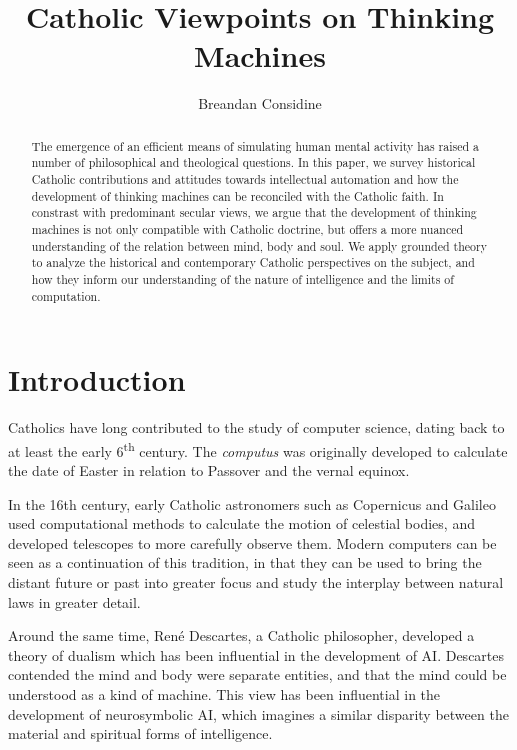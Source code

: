 \documentclass[sigplan,nonacm]{acmart}\settopmatter{printfolios=false,printccs=false,printacmref=false}
\begin{document}
  \title{Catholic Viewpoints on Thinking Machines}
  \begin{abstract}
    The emergence of an efficient means of simulating human mental activity has raised a number of philosophical and theological questions. In this paper, we survey historical Catholic contributions and attitudes towards intellectual automation and how the development of thinking machines can be reconciled with the Catholic faith. In constrast with predominant secular views, we argue that the development of thinking machines is not only compatible with Catholic doctrine, but offers a more nuanced understanding of the relation between mind, body and soul. We apply grounded theory to analyze the historical and contemporary Catholic perspectives on the subject, and how they inform our understanding of the nature of intelligence and the limits of computation.
  \end{abstract}

  \author{Breandan Considine}

  \maketitle

  \section{Introduction}

  Catholics have long contributed to the study of computer science, dating back to at least the early 6\textsuperscript{th} century. The \textit{computus} was originally developed to calculate the date of Easter in relation to Passover and the vernal equinox.

  In the 16th century, early Catholic astronomers such as Copernicus and Galileo used computational methods to calculate the motion of celestial bodies, and developed telescopes to more carefully observe them. Modern computers can be seen as a continuation of this tradition, in that they can be used to bring the distant future or past into greater focus and study the interplay between natural laws in greater detail.

  Around the same time, Ren\'e Descartes, a Catholic philosopher, developed a theory of dualism which has been influential in the development of AI. Descartes contended the mind and body were separate entities, and that the mind could be understood as a kind of machine. This view has been influential in the development of neurosymbolic AI, which imagines a similar disparity between the material and spiritual forms of intelligence.
\end{document}
